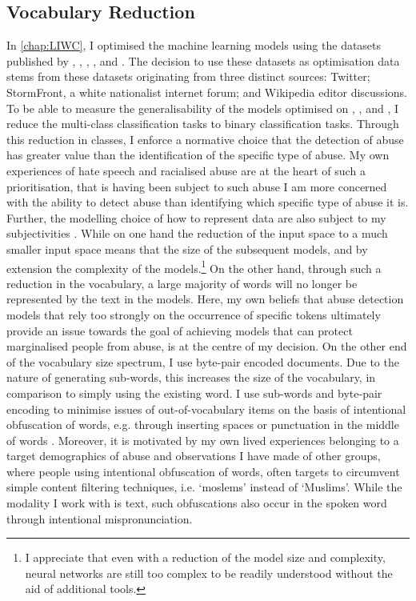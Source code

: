 \subsection{Vocabulary Reduction}\label{sub:vocab_redux}
In \autoref{chap:LIWC}, I optimised the machine learning models using the datasets published by \citet{Davidson:2017}, \citet{Wulczyn:2016}, \citet{Waseem:2016}, \citet{Waseem-Hovy:2016}, and \citet{Garcia:2018}.
The decision to use these datasets as optimisation data stems from these datasets originating from three distinct sources: Twitter; StormFront, a white nationalist internet forum; and Wikipedia editor discussions.
To be able to measure the generalisability of the models optimised on \citet{Davidson:2017}, \citet{Waseem:2016}, and \citet{Waseem-Hovy:2016}, I reduce the multi-class classification tasks to binary classification tasks.
Through this reduction in classes, I enforce a normative choice that the detection of abuse has greater value than the identification of the specific type of abuse.
My own experiences of hate speech and racialised abuse are at the heart of such a prioritisation, that is having been subject to such abuse I am more concerned with the ability to detect abuse than identifying which specific type of abuse it is.
Further, the modelling choice of how to represent data are also subject to my subjectivities .
While on one hand the reduction of the input space to a much smaller input space means that the size of the subsequent models, and by extension the complexity of the models.\footnote{I appreciate that even with a reduction of the model size and complexity, neural networks are still too complex to be readily understood without the aid of additional tools.}
On the other hand, through such a reduction in the vocabulary, a large majority of words will no longer be represented by the text in the models.
Here, my own beliefs that abuse detection models that rely too strongly on the occurrence of specific tokens ultimately provide an issue towards the goal of achieving models that can protect marginalised people from abuse, is at the centre of my decision.
On the other end of the vocabulary size spectrum, I use byte-pair encoded documents.
Due to the nature of generating sub-words, this increases the size of the vocabulary, in comparison to simply using the existing word.
I use sub-words and byte-pair encoding to minimise issues of out-of-vocabulary items on the basis of intentional obfuscation of words, e.g. through inserting spaces or punctuation in the middle of words \citep{Rottger:2021}.
Moreover, it is motivated by my own lived experiences belonging to a target demographics of abuse and observations I have made of other groups, where people using intentional obfuscation of words, often targets to circumvent simple content filtering techniques, i.e. `moslems' instead of `Muslims'.
While the modality I work with is text, such obfuscations also occur in the spoken word through intentional mispronunciation.

